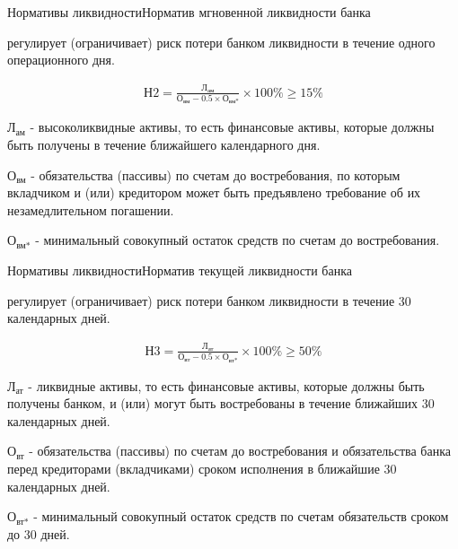 \documentclass[_Banking_p2.tex]{subfiles}
\begin{document}
\begin{frame}[shrink=15]{Нормативы ликвидности}{Норматив мгновенной ликвидности банка}
\begin{block}
\quad
регулирует (ограничивает) риск потери банком ликвидности в течение одного операционного дня.
\end{block}
\begin{align}
\text{Н2}=\frac{\text{Л}_\text{ам}}{\text{О}_\text{вм}-0.5\times \text{О}_\text{вм*}}\times 100\%\geq15\%
\end{align}

$\text{Л}_\text{ам}$ - высоколиквидные активы, то есть финансовые активы, которые должны быть получены в течение ближайшего календарного дня.

$\text{О}_\text{вм}$ - обязательства (пассивы) по счетам до востребования, по которым вкладчиком и (или) кредитором может быть предъявлено требование об их незамедлительном погашении.

$\text{О}_\text{вм*}$ - минимальный совокупный остаток средств по счетам до востребования.
\end{frame}


\begin{frame}[shrink=15]{Нормативы ликвидности}{Норматив текущей ликвидности банка}
\begin{block}
\quad
регулирует (ограничивает) риск потери банком ликвидности в течение 30 календарных дней.
\end{block}
\begin{align}
\text{Н3}=\frac{\text{Л}_\text{ат}}{\text{О}_\text{вт}-0.5\times \text{О}_\text{вт*}}\times 100\%\geq 50\%
\end{align}

$\text{Л}_\text{ат}$ - ликвидные активы, то есть финансовые активы, которые должны быть получены банком, и (или) могут быть востребованы в течение ближайших 30 календарных дней.

$\text{О}_\text{вт}$ - обязательства (пассивы) по счетам до востребования и обязательства банка перед кредиторами (вкладчиками) сроком исполнения в ближайшие 30 календарных дней.

$\text{О}_\text{вт*}$ - минимальный совокупный остаток средств по счетам обязательств сроком до 30 дней.
\end{frame}
\end{document}
